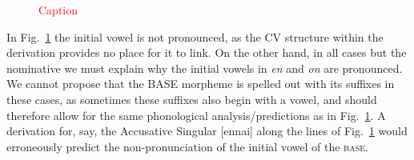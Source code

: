 \documentclass[output=paper,colorlinks,citecolor=brown,
]{langscibook}
\begin{document}
\begin{figure}
    \centering
    \begin{minipage}[t]{.3\textwidth}
    \end{minipage}
    \begin{minipage}[t]{.1\textwidth}
        \rightarrow 
    \end{minipage}
    \begin{minipage}[t]{.3\textwidth}
        \centering
        [nãã]
    \end{minipage}
    \caption{\textcolor{red}{Caption}}
    \label{new17}
\end{figure}

In Fig.~\ref{new17} the initial vowel is not pronounced, as the CV structure within the derivation provides no place for it to link. On the other hand, in all cases but the nominative we must explain why the initial vowels in \textit{en} and \textit{on} are pronounced. We cannot propose that the BASE morpheme is spelled out with its suffixes in these cases, as sometimes these suffixes also begin with a vowel, and should therefore allow for the same phonological analysis/predictions as in Fig.~\ref{new17}. A derivation for, say, the Accusative Singular [ennai] along the lines of Fig.~\ref{new17} would erroneously predict the non-pronunciation of the initial vowel of the \textsc{base}.
\end{document}
